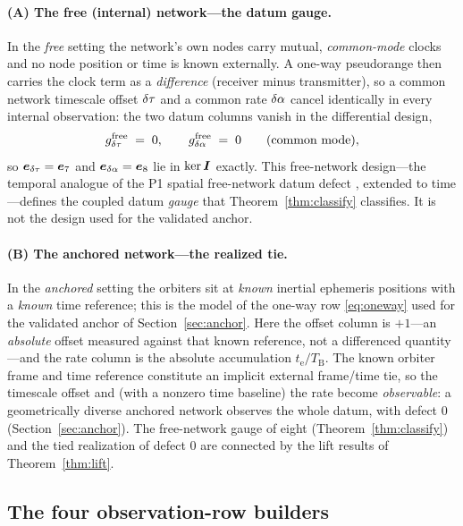 \paragraph{(A) The free (internal) network---the datum gauge.}
In the \emph{free} setting the network's own nodes carry mutual, \emph{common-mode} clocks
and no node position or time is known externally. A one-way pseudorange then carries the
clock term as a \emph{difference} (receiver minus transmitter), so a common network
timescale offset $\delta\tau$ and a common rate $\delta\alpha$ cancel identically in every internal
observation: the two datum columns vanish in the differential design,
\begin{equation}
  g^{\mathrm{free}}_{\delta\tau}\;=\;0,\qquad g^{\mathrm{free}}_{\delta\alpha}\;=\;0
  \qquad\text{(common mode)},
  \label{eq:free}
\end{equation}
so $\bm e_{\delta\tau}=\bm e_7$ and $\bm e_{\delta\alpha}=\bm e_8$ lie in $\ker\bm{I}$ exactly. This
free-network design---the temporal analogue of the P1 spatial free-network datum defect
\citep{baweja2026datum}, extended to time---defines the coupled datum \emph{gauge} that
Theorem~\ref{thm:classify} classifies. It is not the design used for the validated anchor.

\paragraph{(B) The anchored network---the realized tie.}
In the \emph{anchored} setting the orbiters sit at \emph{known} inertial ephemeris
positions with a \emph{known} time reference; this is the model of the one-way row
\eqref{eq:oneway} used for the validated anchor of Section~\ref{sec:anchor}. Here the
offset column is $+1$---an \emph{absolute} offset measured against that known reference,
not a differenced quantity---and the rate column is the absolute accumulation
$t_{\mathrm e}/T_{\mathrm B}$. The known orbiter frame and time reference constitute an
implicit external frame/time tie, so the timescale offset and (with a nonzero time
baseline) the rate become \emph{observable}: a geometrically diverse anchored network
observes the whole datum, with defect $0$ (Section~\ref{sec:anchor}). The free-network
gauge of eight (Theorem~\ref{thm:classify}) and the tied realization of defect $0$ are
connected by the lift results of Theorem~\ref{thm:lift}.

\subsection{The four observation-row builders}
\label{sec:rows}

